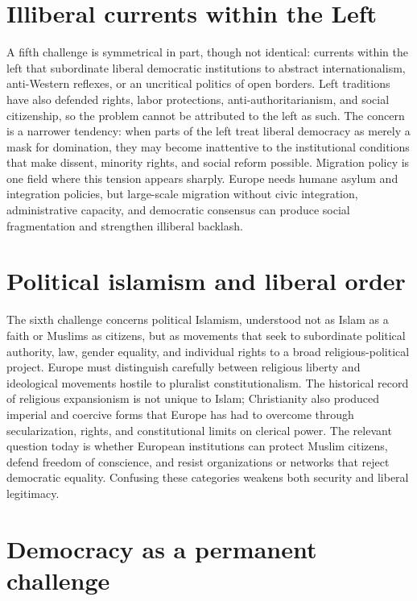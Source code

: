 \section{Illiberal currents within the Left}

A fifth challenge is symmetrical in part, though not identical: currents within the left that subordinate liberal democratic institutions to abstract internationalism, anti-Western reflexes, or an uncritical politics of open borders. Left traditions have also defended rights, labor protections, anti-authoritarianism, and social citizenship, so the problem cannot be attributed to the left as such. The concern is a narrower tendency: when parts of the left treat liberal democracy as merely a mask for domination, they may become inattentive to the institutional conditions that make dissent, minority rights, and social reform possible. Migration policy is one field where this tension appears sharply. Europe needs humane asylum and integration policies, but large-scale migration without civic integration, administrative capacity, and democratic consensus can produce social fragmentation and strengthen illiberal backlash.

\section{Political islamism and liberal order}

The sixth challenge concerns political Islamism, understood not as Islam as a faith or Muslims as citizens, but as movements that seek to subordinate political authority, law, gender equality, and individual rights to a broad religious-political project. Europe must distinguish carefully between religious liberty and ideological movements hostile to pluralist constitutionalism. The historical record of religious expansionism is not unique to Islam; Christianity also produced imperial and coercive forms that Europe has had to overcome through secularization, rights, and constitutional limits on clerical power. The relevant question today is whether European institutions can protect Muslim citizens, defend freedom of conscience, and resist organizations or networks that reject democratic equality. Confusing these categories weakens both security and liberal legitimacy.

\section{Democracy as a permanent challenge}

